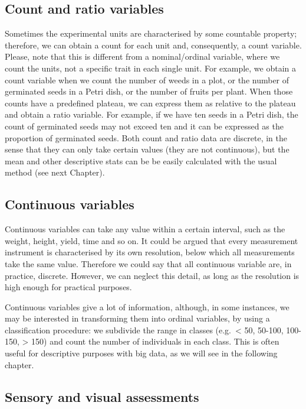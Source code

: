 \documentclass[a4paper,12pt,oneside]{book}
\begin{document}
\hypertarget{count-and-ratio-variables}{%
\subsection{Count and ratio variables}\label{count-and-ratio-variables}}

Sometimes the experimental units are characterised by some countable property; therefore, we can obtain a count for each unit and, consequently, a count variable. Please, note that this is different from a nominal/ordinal variable, where we count the units, not a specific trait in each single unit. For example, we obtain a count variable when we count the number of weeds in a plot, or the number of germinated seeds in a Petri dish, or the number of fruits per plant. When those counts have a predefined plateau, we can express them as relative to the plateau and obtain a ratio variable. For example, if we have ten seeds in a Petri dish, the count of germinated seeds may not exceed ten and it can be expressed as the proportion of germinated seeds. Both count and ratio data are discrete, in the sense that they can only take certain values (they are not continuous), but the mean and other descriptive stats can be be easily calculated with the usual method (see next Chapter).

\hypertarget{continuous-variables}{%
\subsection{Continuous variables}\label{continuous-variables}}

Continuous variables can take any value within a certain interval, such as the weight, height, yield, time and so on. It could be argued that every measurement instrument is characterised by its own resolution, below which all measurements take the same value. Therefore we could say that all continuous variable are, in practice, discrete. However, we can neglect this detail, as long as the resolution is high enough for practical purposes.

Continuous variables give a lot of information, although, in some instances, we may be interested in transforming them into ordinal variables, by using a classification procedure: we subdivide the range in classes (e.g.~\textless{} 50, 50-100, 100-150, \textgreater{} 150) and count the number of individuals in each class. This is often useful for descriptive purposes with big data, as we will see in the following chapter.

\hypertarget{sensory-and-visual-assessments}{%
\subsection{Sensory and visual assessments}\label{sensory-and-visual-assessments}}
\end{document}
